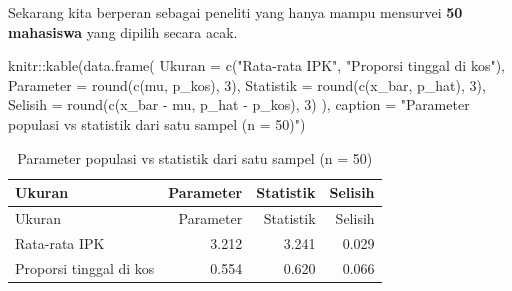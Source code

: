 \documentclass[
  indonesian,
  letterpaper,
]{book}
\newenvironment{Shaded}{\begin{snugshade}}{\end{snugshade}}
\newcommand{\AttributeTok}[1]{\textcolor[rgb]{0.40,0.45,0.13}{#1}}
\newcommand{\DecValTok}[1]{\textcolor[rgb]{0.68,0.00,0.00}{#1}}
\newcommand{\FunctionTok}[1]{\textcolor[rgb]{0.28,0.35,0.67}{#1}}
\newcommand{\NormalTok}[1]{\textcolor[rgb]{0.00,0.23,0.31}{#1}}
\newcommand{\OtherTok}[1]{\textcolor[rgb]{0.00,0.23,0.31}{#1}}
\newcommand{\SpecialCharTok}[1]{\textcolor[rgb]{0.37,0.37,0.37}{#1}}
\newcommand{\StringTok}[1]{\textcolor[rgb]{0.13,0.47,0.30}{#1}}
\begin{document}
Sekarang kita berperan sebagai peneliti yang hanya mampu mensurvei
\textbf{50 mahasiswa} yang dipilih secara acak.

\begin{Shaded}
\end{Shaded}

\begin{Shaded}
\begin{Highlighting}[]
\NormalTok{knitr}\SpecialCharTok{::}\FunctionTok{kable}\NormalTok{(}\FunctionTok{data.frame}\NormalTok{(}
\AttributeTok{Ukuran =} \FunctionTok{c}\NormalTok{(}\StringTok{"Rata{-}rata IPK"}\NormalTok{, }\StringTok{"Proporsi tinggal di kos"}\NormalTok{),}
\AttributeTok{Parameter =} \FunctionTok{round}\NormalTok{(}\FunctionTok{c}\NormalTok{(mu, p\_kos), }\DecValTok{3}\NormalTok{),}
\AttributeTok{Statistik =} \FunctionTok{round}\NormalTok{(}\FunctionTok{c}\NormalTok{(x\_bar, p\_hat), }\DecValTok{3}\NormalTok{),}
\AttributeTok{Selisih =} \FunctionTok{round}\NormalTok{(}\FunctionTok{c}\NormalTok{(x\_bar }\SpecialCharTok{{-}}\NormalTok{ mu, p\_hat }\SpecialCharTok{{-}}\NormalTok{ p\_kos), }\DecValTok{3}\NormalTok{)}
\NormalTok{), }\AttributeTok{caption =} \StringTok{"Parameter populasi vs statistik dari satu sampel (n = 50)"}\NormalTok{)}
\end{Highlighting}
\end{Shaded}

\begin{longtable}[]{@{}lrrr@{}}
\caption{Parameter populasi vs statistik dari satu sampel (n =
50)}\tabularnewline
\toprule\noalign{}
Ukuran & Parameter & Statistik & Selisih \\
\midrule\noalign{}
\endfirsthead
\toprule\noalign{}
Ukuran & Parameter & Statistik & Selisih \\
\midrule\noalign{}
\endhead
\bottomrule\noalign{}
\endlastfoot
Rata-rata IPK & 3.212 & 3.241 & 0.029 \\
Proporsi tinggal di kos & 0.554 & 0.620 & 0.066 \\
\end{longtable}
\end{document}
